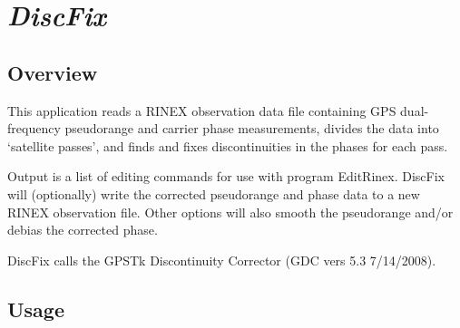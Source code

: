 %
%


\section{\emph{DiscFix}}
\subsection{Overview}
This application reads a RINEX observation data file containing GPS dual-frequency pseudorange and carrier phase measurements, divides the data into `satellite passes', and finds and fixes discontinuities in the phases for each pass.

Output is a list of editing commands for use with program EditRinex. DiscFix will (optionally) write the corrected pseudorange and phase data to a new RINEX observation file. Other options will also smooth the pseudorange and/or debias the corrected phase. 

DiscFix calls the GPSTk Discontinuity Corrector (GDC vers 5.3 7/14/2008).

\subsection{Usage}
